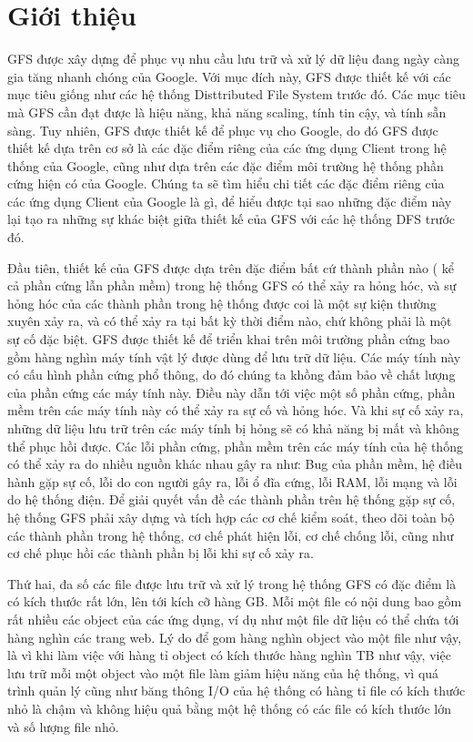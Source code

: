 \documentclass[a4paper, 10pt, conference]{IEEEconf}
\begin{document}
\section{Giới thiệu}
GFS được xây dựng để phục vụ nhu cầu lưu trữ và xử lý dữ liệu đang ngày càng gia tăng nhanh chóng của Google. Với mục đích này, GFS được thiết kế với các mục tiêu giống như các hệ thống Disttributed File System trước đó. Các mục tiêu mà GFS cần đạt được là hiệu năng, khả năng scaling, tính tin cậy, và tính sẵn sàng. Tuy nhiên, GFS được thiết kế để phục vụ cho Google, do đó GFS được thiết kế dựa trên cơ sở là các đặc điểm riêng của các ứng dụng Client trong hệ thống của Google, cũng như dựa trên các đặc điểm môi trường hệ thống phần cứng hiện có của Google. Chúng ta sẽ tìm hiểu chi tiết các đặc điểm riêng của các ứng dụng Client của Google là gì, để hiểu được tại sao những đặc điểm này lại tạo ra  những sự khác biệt giữa thiết kế của GFS với các hệ thống DFS trước đó.

Đầu tiên, thiết kế của GFS được dựa trên đặc điểm bất cứ thành phần nào ( kể cả phần cứng lẫn phần mềm) trong hệ thống GFS có thể xảy ra hỏng hóc, và sự hỏng hóc của các thành phần trong hệ thống được coi là một sự kiện thường xuyên xảy ra, và có thể xảy ra tại bất kỳ thời điểm nào, chứ không phải là một sự cố đặc biệt. GFS được thiết kế để triển khai trên môi trường phần cứng bao gồm hàng nghìn máy tính vật lý được dùng để lưu trữ dữ liệu. Các máy tính này có cấu hình phần cứng phổ thông, do đó chúng ta khồng đảm bảo về chất lượng của phần cứng các máy tính này. Điều này dẫn tới việc một số phần cứng, phần mềm trên các máy tính này có thể xảy ra sự cố và hỏng hóc. Và khi sự cố xảy ra, những dữ liệu lưu trữ trên các máy tính bị hỏng sẽ có khả năng bị mất và không thể phục hồi được. Các lỗi phần cứng, phần mềm trên các máy tính của hệ thống có thể xảy ra do nhiều nguồn khác nhau gây ra như: Bug của phần mềm, hệ điều hành gặp sự cố, lỗi do con người gây ra, lỗi ổ đĩa cứng, lỗi RAM, lỗi mạng và lỗi do hệ thống điện. Để giải quyết vấn đề các thành phần trên hệ thống gặp sự cố, hệ thống GFS phải xây dựng và tích hợp các cơ chế kiểm soát, theo dõi toàn bộ các thành phần trong hệ thống, cơ chế phát hiện lỗi, cơ chế chống lỗi, cũng như cơ chế phục hồi các thành phần bị lỗi khi sự cố xảy ra.

Thứ hai, đa số các file được lưu trữ và xử lý trong hệ thống GFS có đặc điểm là có kích thước rất lớn, lên tới kích cỡ hàng GB. Mỗi một file có nội dung bao gồm rất nhiều các object của các ứng dụng, ví dụ như một file dữ liệu có thể chứa tới hàng nghìn các trang web. Lý do để gom hàng nghìn object vào một file như vậy, là vì khi làm việc với hàng tỉ object có kích thước hàng nghìn TB như vậy, việc lưu trữ mỗi một object vào một file làm giảm hiệu năng của hệ thống, vì quá trình quản lý cũng như băng thông I/O của hệ thống có hàng tỉ file có kích thước nhỏ là chậm và không hiệu quả bằng một hệ thống có các file có kích thước lớn và số lượng file nhỏ.
\end{document}
